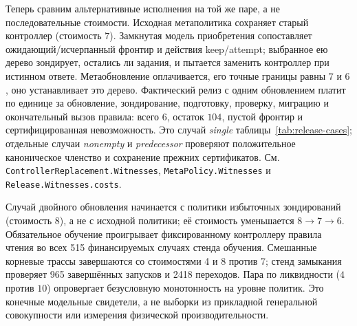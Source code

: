 \documentclass[10pt,a4paper]{article}
\newcommand{\rc}[1]{\allowbreak\texttt{#1}\allowbreak}
\begin{document}
Теперь сравним альтернативные исполнения на той же паре, а не последовательные стоимости. Исходная метаполитика сохраняет старый контроллер (стоимость $7$). Замкнутая модель приобретения сопоставляет ожидающий/исчерпанный фронтир и действия keep/attempt; выбранное ею дерево зондирует, остались ли задания, и пытается заменить контроллер при истинном ответе. Метаобновление оплачивается, его точные границы равны $7$ и $6$, оно устанавливает это дерево. Фактический релиз с одним обновлением платит по единице за обновление, зондирование, подготовку, проверку, миграцию и окончательный вызов правила: всего $6$, остаток $104$, пустой фронтир и сертифицированная невозможность. Это случай \emph{single} таблицы~\ref{tab:release-cases}; отдельные случаи \emph{nonempty} и \emph{predecessor} проверяют положительное каноническое членство и сохранение прежних сертификатов. См. \rc{ControllerReplacement.Witnesses}, \rc{MetaPolicy.Witnesses} и \rc{Release.Witnesses.costs}.

Случай двойного обновления начинается с политики избыточных зондирований (стоимость $8$), а не с исходной политики; её стоимость уменьшается $8\to7\to6$. Обязательное обучение проигрывает фиксированному контроллеру правила чтения во всех 515 финансируемых случаях стенда обучения. Смешанные корневые трассы завершаются со стоимостями 4 и 8 против 7; стенд замыкания проверяет 965 завершённых запусков и 2418 переходов. Пара по ликвидности ($4$ против $10$) опровергает безусловную монотонность на уровне политик. Это конечные модельные свидетели, а не выборки из прикладной генеральной совокупности или измерения физической производительности.

\newpage
\end{document}
